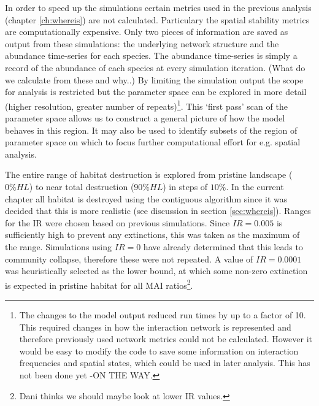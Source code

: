 \begin{itemize}
In order to speed up the simulations certain metrics used in the previous analysis (chapter \ref{ch:whereis}) are not calculated. Particulary the spatial stability metrics are computationally expensive. Only two pieces of information are saved as output from these simulations: the underlying network structure and the abundance time-series for each species. The abundance time-series is simply a record of the abundance of each species at every simulation iteration. (What do we calculate from these and why..) By limiting the simulation output the scope for analysis is restricted but the parameter space can be explored in more detail (higher resolution, greater number of repeats)\footnote{The changes to the model output reduced run times by up to a factor of 10. This required changes in how the interaction network is represented and therefore previously used network metrics could not be calculated. However it would be easy to modify the code to save some information on interaction frequencies and spatial states, which could be used in later analysis. This has not been done yet -ON THE WAY.}. This `first pass' scan of the parameter space allows us to construct a general picture of how the model behaves in this region. It may also be used to identify subsets of the  region of parameter space on which to focus further computational effort for e.g. spatial analysis.

The entire range of habitat destruction is explored from pristine landscape ($0\% HL$) to near total destruction ($90\%HL$) in steps of $10\%$. In the current chapter all habitat is destroyed using the contiguous algorithm since it was decided that this is more realistic (see discussion in section \ref{sec:whereis}). Ranges for the IR were chosen based on previous simulations. Since $IR=0.005$ is sufficiently high to prevent any extinctions, this was taken as the maximum of the range. Simulations using $IR=0$ have already determined that this leads to community collapse, therefore these were not repeated. A value of $IR=0.0001$ was heuristically selected as the lower bound, at which some non-zero extinction is expected in pristine habitat for all MAI ratios\footnote{Dani thinks we should maybe look at lower IR values.}.


\end{itemize}
